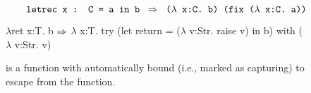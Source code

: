 \begin{figure*}[h]

\newline
\begin{minipage}[b]{0.3\textwidth}
  \begin{prooftree}
  \end{prooftree}
\end{minipage}
\begin{minipage}[b]{0.5\textwidth}
  \begin{prooftree}
  \end{prooftree}
\end{minipage}
\begin{minipage}[b]{0.4\textwidth}
  \begin{prooftree}
  \end{prooftree}
\end{minipage}

\begin{minipage}[b]{0.45\textwidth}
  \begin{prooftree}
  \end{prooftree}
\end{minipage}
\begin{minipage}[b]{0.45\textwidth}
  \begin{prooftree}
  \end{prooftree}
\end{minipage}

\[
\qquad\DesugarRule
    {letrec x : C = a in b}
    {($\lambda$ x:C. b) (fix ($\lambda$ x:C. a))}
\]
\begin{Codes}
\(\lambda\)ret x:T. b
\(\To\) \(\lambda\) x:T. try (let return = (\(\lambda\) v:Str. raise v) in b) with (\(\lambda\) v:Str. v)
\end{Codes}
\qquad {} is a function with 
automatically bound (i.e., marked as capturing) to escape from the function.


\end{figure*}
